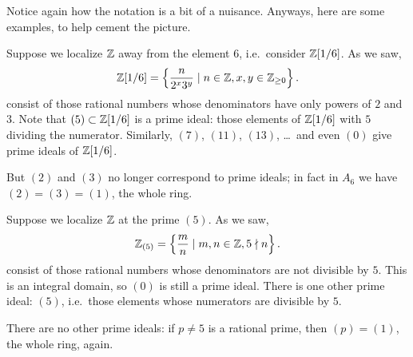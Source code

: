 Notice again how the notation is a bit of a nuisance.
Anyways, here are some examples, to help cement the picture.
\begin{example}
	Suppose we localize $\mathbb Z$ away from the element $6$,
	i.e.\ consider $\mathbb Z[1/6]$.
	As we saw,
	\[ \mathbb Z[1/6] = \left\{ \frac{n}{2^x 3^y} \mid n \in \mathbb Z,
		x,y \in \mathbb Z_{\ge 0} \right\}.  \]
	consist of those rational numbers whose
	denominators have only powers of $2$ and $3$.
	Note that $(5) \subset \mathbb Z[1/6]$ is a prime ideal:
	those elements of $\mathbb Z[1/6]$ with $5$ dividing the numerator.
	Similarly, $(7)$, $(11)$, $(13)$, \dots\
	and even $(0)$ give prime ideals of $\mathbb Z[1/6]$.

	But $(2)$ and $(3)$ no longer correspond to
	prime ideals; in fact in $A_6$ we have $(2) = (3) = (1)$,
	the whole ring.
\end{example}

\begin{example}
	Suppose we localize $\mathbb Z$ at the prime $(5)$.
	As we saw,
	\[ \mathbb Z_{(5)} = \left\{ \frac{m}{n} \mid m,n \in \mathbb Z,
			5 \nmid n \right\}.  \]
	consist of those rational numbers whose
	denominators are not divisible by $5$.
	This is an integral domain, so $(0)$ is still a prime ideal.
	There is one other prime ideal: $(5)$,
	i.e.\ those elements whose numerators are divisible by $5$.

	There are no other prime ideals:
	if $p \neq 5$ is a rational prime,
	then $(p) = (1)$, the whole ring, again.
\end{example}

